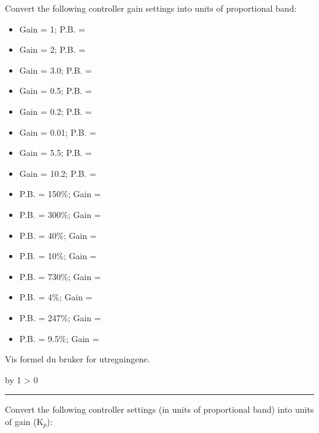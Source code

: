 \documentclass[12pt,a4paper]{article}
\def\oppgave{
            \advance\questnum by 1
            \ifnum \questnum > 0
                 \hrule
                 \vskip 3pt
                 \leftline{Oppgave \the\questnum}
                 \vskip 3pt \fi}
\begin{document}
Convert the following controller gain settings into units of proportional band:
\begin{multicols}{2}
\begin{itemize}
\item{}Gain = 1; P.B. = \underbar{\hskip 50pt}
\vskip 5pt
\item{}Gain = 2; P.B. = \underbar{\hskip 50pt} 
\vskip 5pt
\item{}Gain = 3.0; P.B. = \underbar{\hskip 50pt} 
\vskip 5pt
\item{}Gain = 0.5; P.B. = \underbar{\hskip 50pt}
\vskip 5pt
\item{}Gain = 0.2; P.B. = \underbar{\hskip 50pt} 
\vskip 5pt
\item{}Gain = 0.01; P.B. = \underbar{\hskip 50pt} 
\vskip 5pt
\item{}Gain = 5.5; P.B. = \underbar{\hskip 50pt} 
\vskip 5pt
\item{}Gain = 10.2; P.B. = \underbar{\hskip 50pt} 
\end{itemize} 



\begin{itemize}
\item{}P.B. = 150\%; Gain = \underbar{\hskip 50pt}
\vskip 5pt
\item{}P.B. = 300\%; Gain = \underbar{\hskip 50pt} 
\vskip 5pt
\item{}P.B. = 40\%; Gain = \underbar{\hskip 50pt} 
\vskip 5pt
\item{}P.B. = 10\%; Gain = \underbar{\hskip 50pt} 
\vskip 5pt
\item{}P.B. = 730\%; Gain = \underbar{\hskip 50pt} 
\vskip 5pt
\item{}P.B. = 4\%; Gain = \underbar{\hskip 50pt} 
\vskip 5pt
\item{}P.B. = 247\%; Gain = \underbar{\hskip 50pt} 
\vskip 5pt
\item{}P.B. = 9.5\%; Gain = \underbar{\hskip 50pt} 
\end{itemize} 
\end{multicols}

\vskip 5pt 
Vis formel du bruker for utregningene. 
\vskip 5pt 
\vfil \eject
\vskip 10pt \filbreak 
\oppgave{} 

Convert the following controller settings (in units of proportional band) into units of gain (K$_{p}$):
\end{document}
